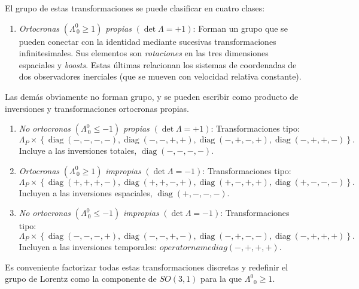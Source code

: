 \documentclass[a4paper,11pt]{book} %
\begin{document}
\medskip\newline
El grupo de estas transformaciones se puede clasificar en cuatro clases:
\begin{enumerate}
    \item \textit{Ortocronas} $(\Lambda^{0}_{\ 0} \geq 1)$ \textit{propias} $(\det \Lambda = +1)$:
    Forman un grupo que se pueden conectar con la identidad mediante
    sucesivas transformaciones infinitesimales. Sus elementos son
    \textit{rotaciones} en las tres dimensiones espaciales y \textit{boosts}. Estas
    últimas relacionan los sistemas de coordenadas de dos observadores
    inerciales (que se mueven con velocidad relativa constante).
\end{enumerate}
\noindent    
Las demás obviamente no forman grupo, y se pueden escribir como producto de inversiones y transformaciones ortocronas propias.
\begin{enumerate}
    \item \textit{No ortocronas} $(\Lambda^{0}_{\ 0} \leq -1)$
    \textit{propias} $(\det \Lambda = +1)$:
    Transformaciones tipo: \[\Lambda_P \times\left\{\operatorname{diag}(-,-,-,-),\operatorname{diag}(-,-,+,+),\operatorname{diag}(-,+,-,+),\operatorname{diag}(-,+,+,-)\right\}.\]
    \noindent
    Incluye a las inversiones totales, $\operatorname{diag}(-,-,-,-).$
    \item \textit{Ortocronas} $(\Lambda^{0}_{\ 0} \geq 1)$
    \textit{impropias} $(\det \Lambda = -1)$:
    Transformaciones tipo:
    \[
        \Lambda_P \times
        \left\{
        \operatorname{diag}(+,+,+,-),
        \operatorname{diag}(+,+,-,+),
        \operatorname{diag}(+,-,+,+),
        \operatorname{diag}(+,-,-,-)
        \right\}.
    \]
    \noindent
    Incluyen a las inversiones espaciales, $\operatorname{diag}(+,-,-,-).$
    \item \textit{No ortocronas} $(\Lambda^{0}_{\ 0} \leq -1)$
    \textit{impropias} $(\det \Lambda = -1)$:
    Transformaciones tipo:
    \[
        \Lambda_P \times
        \left\{
        \operatorname{diag}(-,-,-,+),
        \operatorname{diag}(-,-,+,-),
        \operatorname{diag}(-,+,-,-),
        \operatorname{diag}(-,+,+,+)
        \right\}.
    \]
    \noindent
    Incluyen a las inversiones temporales: $operatorname{diag}(-,+,+,+).$
\end{enumerate}
\noindent
Es conveniente factorizar todas estas transformaciones discretas y redefinir el grupo de Lorentz como la componente de $SO(3,1)$ para la que $\Lambda^0{}_0 \geq 1$.
\end{document}
